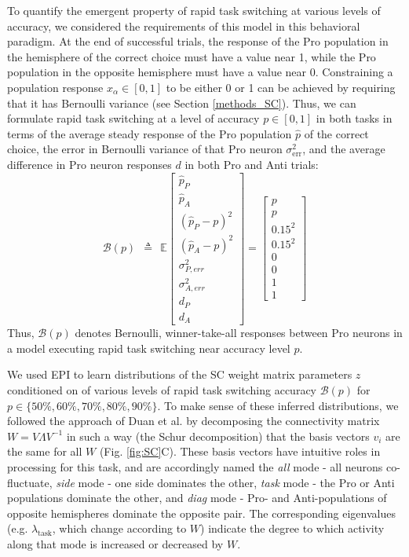 \documentclass[11pt]{article}
\begin{document}
To quantify the emergent property of rapid task switching at various levels of accuracy, we considered the requirements of this model in this behavioral paradigm.
At the end of successful trials, the response of the Pro population in the hemisphere of the correct choice must have a value near 1, while the Pro population in the opposite hemisphere must have a value near 0.
Constraining a population response $x_\alpha \in \left[0,1\right]$ to be either 0 or 1 can be achieved by requiring that it has Bernoulli variance (see Section \ref{methods_SC}).
Thus, we can formulate rapid task switching at a level of accuracy $p \in \left[0, 1\right]$ in both tasks in terms of the average steady response of the Pro population $\hat{p}$ of the correct choice,  the error in Bernoulli variance of that Pro neuron $\sigma^2_{\text{err}}$, and the average difference in Pro neuron responses $d$ in both Pro and Anti trials:
\begin{equation}
\mathcal{B}(p) ~~\triangleq~~ \mathbb{E}\begin{bmatrix} \hat{p}_P \\ \hat{p}_A \\ (\hat{p}_P-p)^2 \\ (\hat{p}_A - p)^2 \\ \sigma^2_{P,err} \\ \sigma^2_{A,err} \\ d_P \\ d_A \end{bmatrix} = \begin{bmatrix} p \\ p \\ 0.15^2 \\ 0.15^2 \\ 0 \\ 0 \\ 1 \\ 1 \end{bmatrix}
\end{equation}
Thus, $\mathcal{B}(p)$ denotes Bernoulli, winner-take-all responses between Pro neurons in a model executing rapid task switching near accuracy level $p$.

We used EPI to learn distributions of the SC weight matrix parameters $z$ conditioned on of various levels of rapid task switching accuracy $\mathcal{B}(p)$ for $p \in \{50\%, 60\%, 70\%, 80\%, 90\%\}$.
To make sense of these inferred distributions, we followed the approach of Duan et al. by decomposing the connectivity matrix $W = V\Lambda V^{-1}$ in such a way (the Schur decomposition) that the basis vectors $v_i$ are the same for all $W$ (Fig. \ref{fig:SC}C). These basis vectors have intuitive roles in processing for this task, and are accordingly named the \textit{all} mode - all neurons co-fluctuate, \textit{side} mode - one side dominates the other, \textit{task} mode - the Pro or Anti populations dominate the other, and \textit{diag} mode - Pro- and Anti-populations of opposite hemispheres dominate the opposite pair. 
The corresponding eigenvalues (e.g. $\lambda_{\text{task}}$, which change according to $W$) indicate the degree to which activity along that mode is increased or decreased by $W$. 
\end{document}
